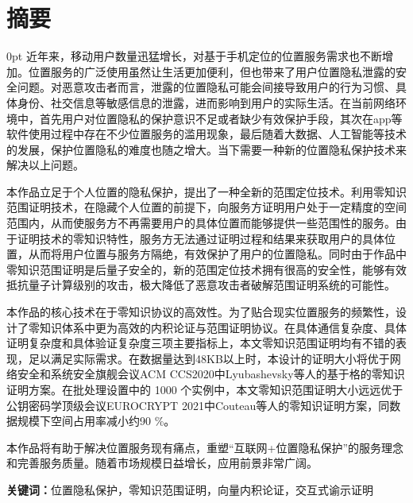 \documentclass[zihao=-4]{ctexart}
\newcommand{\setParDis}{\setlength {\parskip} {0pt} }
\begin{document}
\section*{摘要}
\begin{spacing}{1.5}
  \setParDis %
  近年来，移动用户数量迅猛增长，对基于手机定位的位置服务需求也不断增加。位置服务的广泛使用虽然让生活更加便利，但也带来了用户位置隐私泄露的安全问题。对恶意攻击者而言，泄露的位置隐私可能会间接导致用户的行为习惯、具体身份、社交信息等敏感信息的泄露，进而影响到用户的实际生活。在当前网络环境中，首先用户对位置隐私的保护意识不足或者缺少有效保护手段，其次在app等软件使用过程中存在不少位置服务的滥用现象，最后随着大数据、人工智能等技术的发展，保护位置隐私的难度也随之增大。当下需要一种新的位置隐私保护技术来解决以上问题。\par
本作品立足于个人位置的隐私保护，提出了一种全新的范围定位技术。利用零知识范围证明技术，在隐藏个人位置的前提下，向服务方证明用户处于一定精度的空间范围内，从而使服务方不再需要用户的具体位置而能够提供一些范围性的服务。由于证明技术的零知识特性，服务方无法通过证明过程和结果来获取用户的具体位置，从而将用户位置与服务方隔绝，有效保护了用户的位置隐私。同时由于作品中零知识范围证明是后量子安全的，新的范围定位技术拥有很高的安全性，能够有效抵抗量子计算级别的攻击，极大降低了恶意攻击者破解范围证明系统的可能性。\par
本作品的核心技术在于零知识协议的高效性。为了贴合现实位置服务的频繁性，设计了零知识体系中更为高效的内积论证与范围证明协议。在具体通信复杂度、具体证明复杂度和具体验证复杂度三项主要指标上，本文零知识范围证明均有不错的表现，足以满足实际需求。在数据量达到48KB以上时，本设计的证明大小将优于网络安全和系统安全旗舰会议ACM \quad CCS\quad 2020中Lyubashevsky等人的基于格的零知识证明方案。在批处理设置中的 1000 个实例中，本文零知识范围证明大小远远优于公钥密码学顶级会议EUROCRYPT \quad 2021中Couteau等人的零知识证明方案，同数据规模下空间占用率减小约90 \%。\par
本作品将有助于解决位置服务现有痛点，重塑“互联网+位置隐私保护”的服务理念和完善服务质量。随着市场规模日益增长，应用前景非常广阔。\par
\end{spacing}
    
\textbf{关键词：}位置隐私保护，零知识范围证明，向量内积论证，交互式谕示证明
\newpage
\end{document}
